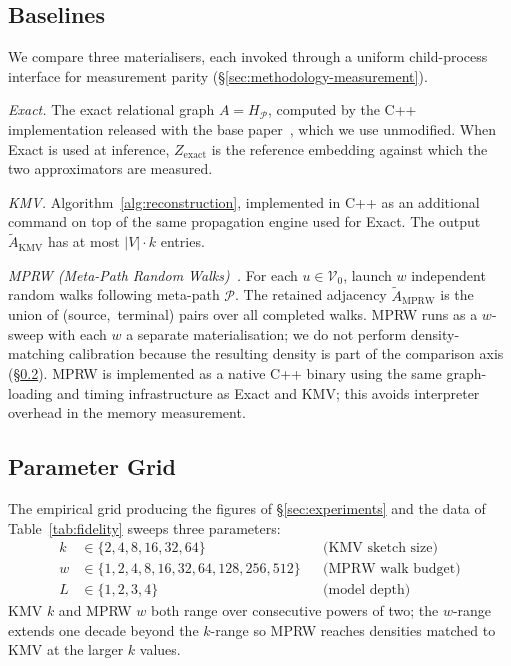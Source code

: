 \documentclass[sigconf]{acmart}
\begin{document}
\subsection{Baselines}
\label{sec:methodology-baselines}

We compare three materialisers, each invoked through a uniform child-process interface for measurement parity (\S\ref{sec:methodology-measurement}).

\emph{Exact.} The exact relational graph $A = H_\mathcal{P}$, computed by the C++ implementation released with the base paper~\cite{berahmand2024kmv}, which we use unmodified. When Exact is used at inference, $Z_\text{exact}$ is the reference embedding against which the two approximators are measured.

\emph{KMV.} Algorithm~\ref{alg:reconstruction}, implemented in C++ as an additional command on top of the same propagation engine used for Exact. The output $\widetilde{A}_\text{KMV}$ has at most $|V|\cdot k$ entries.

\emph{MPRW (Meta-Path Random Walks)~\cite{dong2017metapath2vec}.} For each $u\in\mathcal{V}_0$, launch $w$ independent random walks following meta-path $\mathcal{P}$. The retained adjacency $\widetilde{A}_\text{MPRW}$ is the union of (source,~terminal) pairs over all completed walks. MPRW runs as a $w$-sweep with each $w$ a separate materialisation; we do not perform density-matching calibration because the resulting density is part of the comparison axis (\S\ref{sec:methodology-grid}). MPRW is implemented as a native C++ binary using the same graph-loading and timing infrastructure as Exact and KMV; this avoids interpreter overhead in the memory measurement.

\subsection{Parameter Grid}
\label{sec:methodology-grid}

The empirical grid producing the figures of \S\ref{sec:experiments} and the data of Table~\ref{tab:fidelity} sweeps three parameters:
\begin{align*}
k &\in \{2, 4, 8, 16, 32, 64\} && \text{(KMV sketch size)} \\
w &\in \{1, 2, 4, 8, 16, 32, 64, 128, 256, 512\} && \text{(MPRW walk budget)} \\
L &\in \{1, 2, 3, 4\} && \text{(model depth)}
\end{align*}
KMV $k$ and MPRW $w$ both range over consecutive powers of two; the $w$-range extends one decade beyond the $k$-range so MPRW reaches densities matched to KMV at the larger $k$ values.
\end{document}
